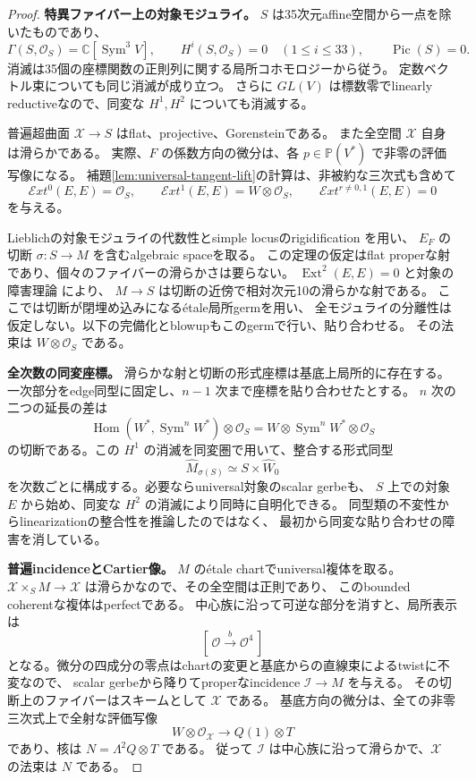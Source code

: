 \documentclass[a4paper,11pt]{ltjsarticle}
\theoremstyle{definition}
\newcommand{\CC}{\mathbb C}
\newcommand{\OO}{\mathcal O}
\newcommand{\PP}{\mathbb P}
\newcommand{\Sym}{\operatorname{Sym}}
\newcommand{\Ext}{\operatorname{Ext}}
\newcommand{\Hom}{\operatorname{Hom}}
\newcommand{\Pic}{\operatorname{Pic}}
\begin{document}
\begin{proof}
\textbf{特異ファイバー上の対象モジュライ。}
$S$ は35次元affine空間から一点を除いたものであり、
\begin{equation}\label{eq:universal-bn-base-vanishing}
 \Gamma(S,\OO_S)=\CC[\Sym^3V],\qquad
 H^i(S,\OO_S)=0\quad(1\le i\le33),\qquad \Pic(S)=0.
\end{equation}
消滅は35個の座標関数の正則列に関する局所コホモロジーから従う。
定数ベクトル束についても同じ消滅が成り立つ。
さらに $GL(V)$ は標数零でlinearly reductiveなので、同変な
$H^1,H^2$ についても消滅する。

普遍超曲面 $\mathcal X\to S$ はflat、projective、Gorensteinである。
また全空間 $\mathcal X$ 自身は滑らかである。
実際、$F$ の係数方向の微分は、各 $p\in\PP(V^*)$ で非零の評価写像になる。
補題\ref{lem:universal-tangent-lift}の計算は、非被約な三次式も含めて
\[
 \mathcal E xt^0(E,E)=\OO_S,\qquad
 \mathcal E xt^1(E,E)=W\otimes\OO_S,
 \qquad \mathcal E xt^{r\ne0,1}(E,E)=0
\]
を与える。

Lieblichの対象モジュライの代数性とsimple locusのrigidification
\cite[Theorem 4.2.1, Corollary 4.3.3]{LieblichComplexes}を用い、
$E_F$ の切断 $\sigma:S\to M$ を含むalgebraic spaceを取る。
この定理の仮定はflat properな射であり、個々のファイバーの滑らかさは要らない。
$\Ext^2(E,E)=0$ と対象の障害理論
\cite[Theorem 3.1.1, Corollary 3.1.2]{LieblichComplexes}により、
$M\to S$ は切断の近傍で相対次元10の滑らかな射である。
ここでは切断が閉埋め込みになる\'etale局所germを用い、
全モジュライの分離性は仮定しない。以下の完備化とblowupもこのgermで行い、貼り合わせる。
その法束は $W\otimes\OO_S$ である。

\textbf{全次数の同変座標。}
滑らかな射と切断の形式座標は基底上局所的に存在する。
一次部分をedge同型に固定し、$n-1$ 次まで座標を貼り合わせたとする。
$n$ 次の二つの延長の差は
\[
 \Hom(W^*,\Sym^nW^*)\otimes\OO_S
       =W\otimes\Sym^nW^*\otimes\OO_S
\]
の切断である。この $H^1$ の消滅を同変圏で用いて、整合する形式同型
\[
                   \widehat M_{\sigma(S)}\simeq S\times\widehat W_0
\]
を次数ごとに構成する。必要ならuniversal対象のscalar gerbeも、
$S$ 上での対象 $E$ から始め、同変な $H^2$ の消滅により同時に自明化できる。
同型類の不変性からlinearizationの整合性を推論したのではなく、
最初から同変な貼り合わせの障害を消している。

\textbf{普遍incidenceとCartier像。}
$M$ の\'etale chartでuniversal複体を取る。
$\mathcal X\times_SM\to\mathcal X$ は滑らかなので、その全空間は正則であり、
このbounded coherentな複体はperfectである。
中心族に沿って可逆な部分を消すと、局所表示は
\[
                       [\,\OO\xrightarrow{\,b\,}\OO^4\,]
\]
となる。微分の四成分の零点はchartの変更と基底からの直線束によるtwistに不変なので、
scalar gerbeから降りてproperなincidence $\mathcal I\to M$ を与える。
その切断上のファイバーはスキームとして $\mathcal X$ である。
基底方向の微分は、全ての非零三次式上で全射な評価写像
\[
 W\otimes\OO_{\mathcal X}\longrightarrow Q(1)\otimes T
\]
であり、核は $N=\Lambda^2Q\otimes T$ である。
従って $\mathcal I$ は中心族に沿って滑らかで、$\mathcal X$ の法束は $N$ である。


\end{proof}
\end{document}
